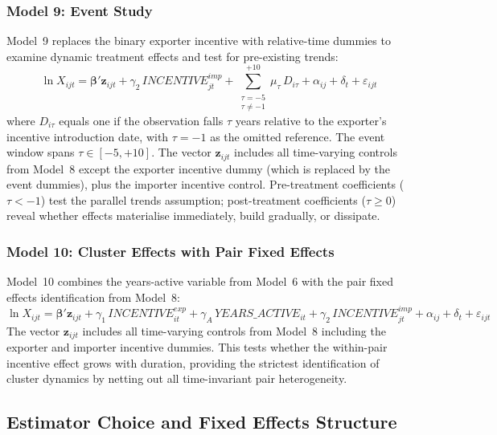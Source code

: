 \subsubsection{Model 9: Event Study}

Model~9 replaces the binary exporter incentive with relative-time dummies to examine dynamic treatment effects and test for pre-existing trends:
\begin{equation}
\ln X_{ijt} = \boldsymbol{\beta}' \mathbf{z}_{ijt} + \gamma_2\, INCENTIVE_{jt}^{imp} + \sum_{\substack{\tau = -5 \\ \tau \neq -1}}^{+10} \mu_\tau\, D_{i\tau} + \alpha_{ij} + \delta_t + \varepsilon_{ijt}
\label{eq:model9}
\end{equation}
where $D_{i\tau}$ equals one if the observation falls $\tau$ years relative to the exporter's incentive introduction date, with $\tau = -1$ as the omitted reference. The event window spans $\tau \in [-5, +10]$. The vector $\mathbf{z}_{ijt}$ includes all time-varying controls from Model~8 except the exporter incentive dummy (which is replaced by the event dummies), plus the importer incentive control. Pre-treatment coefficients ($\tau < -1$) test the parallel trends assumption; post-treatment coefficients ($\tau \geq 0$) reveal whether effects materialise immediately, build gradually, or dissipate.

\subsubsection{Model 10: Cluster Effects with Pair Fixed Effects}

Model~10 combines the years-active variable from Model~6 with the pair fixed effects identification from Model~8:
\begin{equation}
\ln X_{ijt} = \boldsymbol{\beta}' \mathbf{z}_{ijt} + \gamma_1\, INCENTIVE_{it}^{exp} + \gamma_A\, YEARS\_ACTIVE_{it} + \gamma_2\, INCENTIVE_{jt}^{imp} + \alpha_{ij} + \delta_t + \varepsilon_{ijt}
\label{eq:model10}
\end{equation}
The vector $\mathbf{z}_{ijt}$ includes all time-varying controls from Model~8 including the exporter and importer incentive dummies. This tests whether the within-pair incentive effect grows with duration, providing the strictest identification of cluster dynamics by netting out all time-invariant pair heterogeneity.

\subsection{Estimator Choice and Fixed Effects Structure}
\label{sec:estimator_choice}

